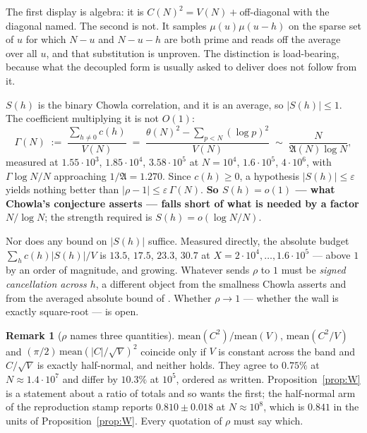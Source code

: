 \documentclass[11pt,a4paper]{article}
\theoremstyle{plain}
\theoremstyle{definition}
\newtheorem{remark}[theorem]{Remark}
\newcommand{\AAA}{\mathfrak{A}}
\begin{document}
The first display is algebra: it is $C(N)^2 = V(N) + {}$off-diagonal
with the diagonal named. The second is not. It samples
$\mu(u)\mu(u-h)$ on the sparse set of $u$ for which $N-u$ and $N-u-h$
are both prime and reads off the average over all $u$, and that
substitution is unproven. The distinction is load-bearing, because
what the decoupled form is usually asked to deliver does not follow
from it.

$S(h)$ is the binary Chowla correlation, and it is an average, so
$|S(h)|\le1$. The coefficient multiplying it is not $O(1)$:
\[
  \Gamma(N) \;:=\; \frac{\sum_{h\neq0}c(h)}{V(N)}
   \;=\; \frac{\theta(N)^2-\sum_{p<N}(\log p)^2}{V(N)}
   \;\sim\; \frac{N}{\AAA(N)\log N},
\]
measured at $1.55\cdot10^{3}$, $1.85\cdot10^{4}$, $3.58\cdot10^{5}$ at
$N = 10^4$, $1.6\cdot10^5$, $4\cdot10^6$, with $\Gamma\log N/N$
approaching $1/\AAA = 1.270$. Since $c(h)\ge0$, a hypothesis
$|S(h)|\le\varepsilon$ yields nothing better than
$|\rho-1| \le \varepsilon\,\Gamma(N)$. \textbf{So $S(h)=o(1)$ --- what
Chowla's conjecture asserts --- falls short of what is needed by a
factor $N/\log N$}; the strength required is $S(h) = o(\log N/N)$.

Nor does any bound on $|S(h)|$ suffice. Measured directly, the
absolute budget $\sum_{h}c(h)|S(h)|/V$ is $13.5$, $17.5$, $23.3$,
$30.7$ at $X = 2\cdot10^4,\dots,1.6\cdot10^5$ --- above $1$ by an
order of magnitude, and growing. Whatever sends $\rho$ to $1$ must be
\emph{signed cancellation across $h$}, a different object from the
smallness Chowla asserts and from the averaged absolute bound of
\cite{MRT15}. Whether $\rho\to1$ --- whether the wall is exactly
square-root --- is open.

\begin{remark}[$\rho$ names three quantities]\label{rem:rho}
$\mathrm{mean}(C^2)/\mathrm{mean}(V)$, $\mathrm{mean}(C^2/V)$ and
$(\pi/2)\,\mathrm{mean}(|C|/\sqrt V)^2$ coincide only if $V$ is
constant across the band and $C/\sqrt V$ is exactly half-normal, and
neither holds. They agree to $0.75\%$ at $N\approx1.4\cdot10^7$ and
differ by $10.3\%$ at $10^5$, ordered as written. Proposition~\ref{prop:W}
is a statement about a ratio of totals and so wants the first; the
half-normal arm of the reproduction stamp reports $0.810\pm0.018$ at
$N\approx10^8$, which is $0.841$ in the units of
Proposition~\ref{prop:W}. Every quotation of $\rho$ must say which.
\end{remark}
\end{document}
